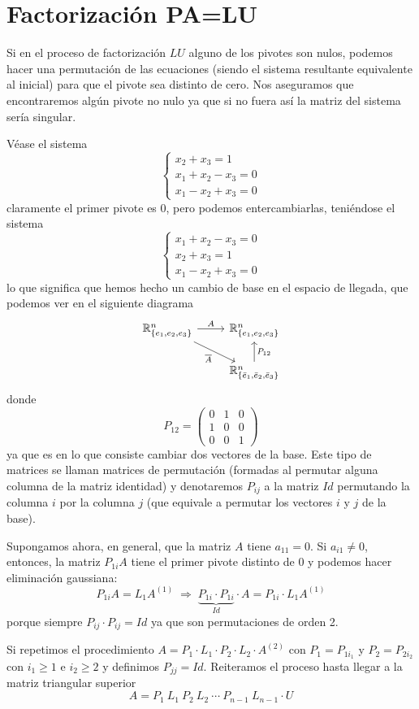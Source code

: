     \section{Factorización PA=LU}
    \begin{obs}
    Si en el proceso de factorización $LU$ alguno de los pivotes son nulos, podemos hacer una permutación de las ecuaciones (siendo el sistema resultante equivalente al inicial) para que el pivote sea distinto de cero. Nos aseguramos que encontraremos algún pivote no nulo ya que si no fuera así la matriz del sistema sería singular.
    \end{obs}
    \begin{ejem}
    Véase el sistema 
    $$\left\{ \begin{array}{l}
        x_2+x_3=1\\x_1+x_2-x_3=0 \\ x_1-x_2+x_3=0
    \end{array} \right.$$
    claramente el primer pivote es 0, pero podemos entercambiarlas, teniéndose el sistema
    $$\left\{ \begin{array}{l}
       x_1+x_2-x_3=0 \\ x_2+x_3=1 \\ x_1-x_2+x_3=0
    \end{array}\right.$$
    lo que significa que hemos hecho un cambio de base en el espacio de llegada, que podemos ver en el siguiente diagrama 
$$\begin{tikzcd}
\mathbb R^{n}_{\{e_1,e_2,e_3\} } \arrow{r}{A}  \arrow[swap]{dr}{\overline{A}} & \mathbb R^{n}_{\{e_1,e_2,e_3\}}\\
& \mathbb R^{n}_{\{\bar{e}_1,\bar{e}_2,\bar{e}_3\}} \arrow{u}[swap]{P_{12}}
\end{tikzcd}$$
donde $$P_{12}=\begin{pmatrix}
    0 & 1 & 0 \\ 1 & 0 & 0 \\ 0 & 0 & 1
\end{pmatrix}$$
ya que es en lo que consiste cambiar dos vectores de la base. Este tipo de matrices  se llaman matrices de permutación (formadas al permutar alguna columna de la matriz identidad) y denotaremos $P_{ij}$ a la matriz $Id$ permutando la columna $i$ por la columna $j$ (que equivale a permutar los vectores $i$ y $j$ de la base). 

Supongamos ahora, en general, que la matriz $A$ tiene $a_{11}=0$. Si $a_{i1} \neq 0$, entonces, la matriz $P_{1i}A$ tiene el primer pivote distinto de $0$ y podemos hacer eliminación gaussiana:
$$P_{1i}A=L_1A^{(1)} \; \Rightarrow \; \underbrace{P_{1i} \cdot P_{1i}}_{Id} \cdot A=P_{1i} \cdot L_1 A^{(1)}$$
porque siempre $P_{ij} \cdot P_{ij}=Id$ ya que son permutaciones de orden 2.

Si repetimos el procedimiento $A=P_1 \cdot L_1 \cdot P_2 \cdot L_2 \cdot A^{(2)}$ con $P_1=P_{1i_1}$ y $P_2=P_{2i_2}$ con $i_1 \geq 1$ e $i_2 \geq 2$ y definimos $P_{jj}=Id$. Reiteramos el proceso hasta llegar a la matriz triangular superior
$$A=P_1 \: L_1 \: P_2 \: L_2 \: \cdots \: P_{n-1} \: L_{n-1} \cdot U$$
\end{ejem}
